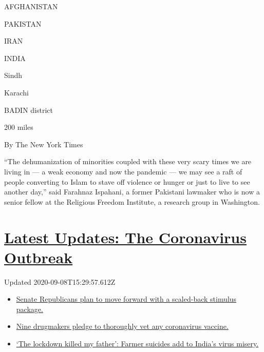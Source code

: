 AFGHANISTAN

PAKISTAN

IRAN

INDIA

Sindh

Karachi

BADIN district

200 miles

By The New York Times

``The dehumanization of minorities coupled with these very scary times
we are living in --- a weak economy and now the pandemic --- we may see
a raft of people converting to Islam to stave off violence or hunger or
just to live to see another day,'' said Farahnaz Ispahani, a former
Pakistani lawmaker who is now a senior fellow at the Religious Freedom
Institute, a research group in Washington.

\hypertarget{latest-updates-the-coronavirus-outbreak}{%
\section{\texorpdfstring{\href{https://www.nytimes3xbfgragh.onion/2020/09/08/world/covid-19-coronavirus.html?action=click\&pgtype=Article\&state=default\&region=MAIN_CONTENT_1\&context=storylines_live_updates}{Latest
Updates: The Coronavirus
Outbreak}}{Latest Updates: The Coronavirus Outbreak}}\label{latest-updates-the-coronavirus-outbreak}}

Updated 2020-09-08T15:29:57.612Z

\begin{itemize}
\tightlist
\item
  \href{https://www.nytimes3xbfgragh.onion/2020/09/08/world/covid-19-coronavirus.html?action=click\&pgtype=Article\&state=default\&region=MAIN_CONTENT_1\&context=storylines_live_updates\#link-547feae1}{Senate
  Republicans plan to move forward with a scaled-back stimulus package.}
\item
  \href{https://www.nytimes3xbfgragh.onion/2020/09/08/world/covid-19-coronavirus.html?action=click\&pgtype=Article\&state=default\&region=MAIN_CONTENT_1\&context=storylines_live_updates\#link-679303d7}{Nine
  drugmakers pledge to thoroughly vet any coronavirus vaccine.}
\item
  \href{https://www.nytimes3xbfgragh.onion/2020/09/08/world/covid-19-coronavirus.html?action=click\&pgtype=Article\&state=default\&region=MAIN_CONTENT_1\&context=storylines_live_updates\#link-1c973131}{`The
  lockdown killed my father': Farmer suicides add to India's virus
  misery.}
\end{itemize}

